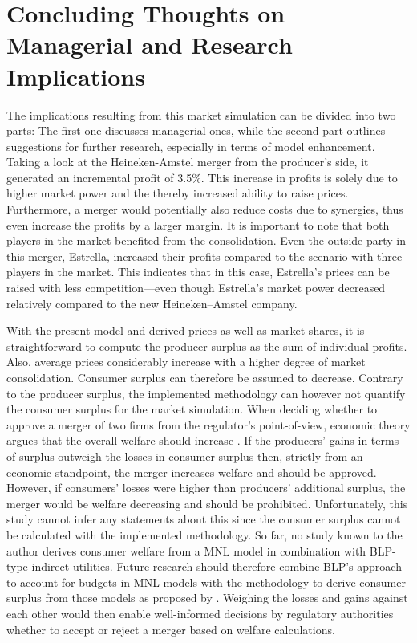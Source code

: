 \documentclass[12pt,a4paper]{article}
\begin{document}
\section{Concluding Thoughts on Managerial and Research Implications}
The implications resulting from this market simulation can be divided into two parts: The first one discusses managerial ones,
while the second part outlines suggestions for further research, especially in terms of model enhancement. 
Taking a look at the Heineken-Amstel merger from the producer's side, it generated an incremental profit of 3.5\%.
This increase in profits is solely due to higher market power and the thereby increased ability to raise prices.
Furthermore, a merger would potentially also reduce costs due to synergies, thus even increase the profits by a larger margin.
It is important to note that both players in the market benefited from the consolidation.
Even the outside party in this merger, Estrella, increased their profits compared to the scenario with three players in the market.
This indicates that in this case, Estrella's prices can be raised with less competition---even though Estrella's market power decreased relatively compared to the new Heineken--Amstel company.

With the present model and derived prices as well as market shares, it is straightforward to compute the producer surplus as the sum of individual profits.
Also, average prices considerably increase with a higher degree of market consolidation.
Consumer surplus can therefore be assumed to decrease.
Contrary to the producer surplus, the implemented methodology can however not quantify the consumer surplus for the market simulation.
When deciding whether to approve a merger of two firms from the regulator's point-of-view, economic theory argues that the overall welfare should increase \citep{perryOligopolyIncentiveHorizontal1985}.
If the producers' gains in terms of surplus outweigh the losses in consumer surplus then, strictly from an economic standpoint, the merger increases welfare and should be approved.
However, if consumers' losses were higher than producers' additional surplus, the merger would be welfare decreasing and should be prohibited.
Unfortunately, this study cannot infer any statements about this since the consumer surplus cannot be calculated with the implemented methodology.
So far, no study known to the author derives consumer welfare from a MNL model in combination with BLP-type indirect utilities.
Future research should therefore combine BLP's approach to account for budgets in MNL models with the methodology to derive consumer surplus from those models as proposed by \cite{trainWelfareCalculationsDiscrete2015}.
Weighing the losses and gains against each other would then enable well-informed decisions by regulatory authorities whether to accept or reject a merger based on welfare calculations.
\end{document}
